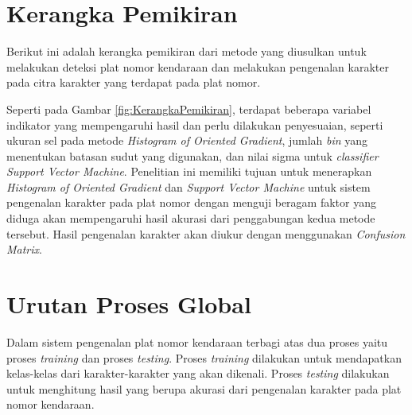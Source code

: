 \section{Kerangka Pemikiran}
\noindent Berikut ini adalah kerangka pemikiran dari metode yang diusulkan untuk melakukan deteksi plat nomor kendaraan dan melakukan pengenalan karakter pada citra karakter yang terdapat pada plat nomor.
\\
\begin{adjustbox}{width=1\textwidth}
	\noindent
	\begin{minipage}{\linewidth}
		\label{fig:KerangkaPemikiran}
	\end{minipage}
\end{adjustbox}

\noindent Seperti pada Gambar \ref{fig:KerangkaPemikiran}, terdapat beberapa variabel indikator yang mempengaruhi hasil dan perlu dilakukan penyesuaian, seperti ukuran sel pada metode \textit{Histogram of Oriented Gradient}, jumlah \textit{bin} yang menentukan batasan sudut yang digunakan, dan nilai sigma untuk \textit{classifier} \textit{Support Vector Machine}. Penelitian ini memiliki tujuan untuk menerapkan \textit{Histogram of Oriented Gradient} dan \textit{Support Vector Machine} untuk sistem pengenalan karakter pada plat nomor dengan menguji beragam faktor yang diduga akan mempengaruhi hasil akurasi dari penggabungan kedua metode tersebut. Hasil pengenalan karakter akan diukur dengan menggunakan \textit{Confusion Matrix}.\\

\section{Urutan Proses Global}
\noindent Dalam sistem pengenalan plat nomor kendaraan terbagi atas dua proses yaitu proses \textit{training} dan proses \textit{testing}. Proses \textit{training} dilakukan untuk mendapatkan kelas-kelas dari karakter-karakter yang akan dikenali. Proses \textit{testing} dilakukan untuk menghitung hasil yang berupa akurasi dari pengenalan karakter pada plat nomor kendaraan.\\

